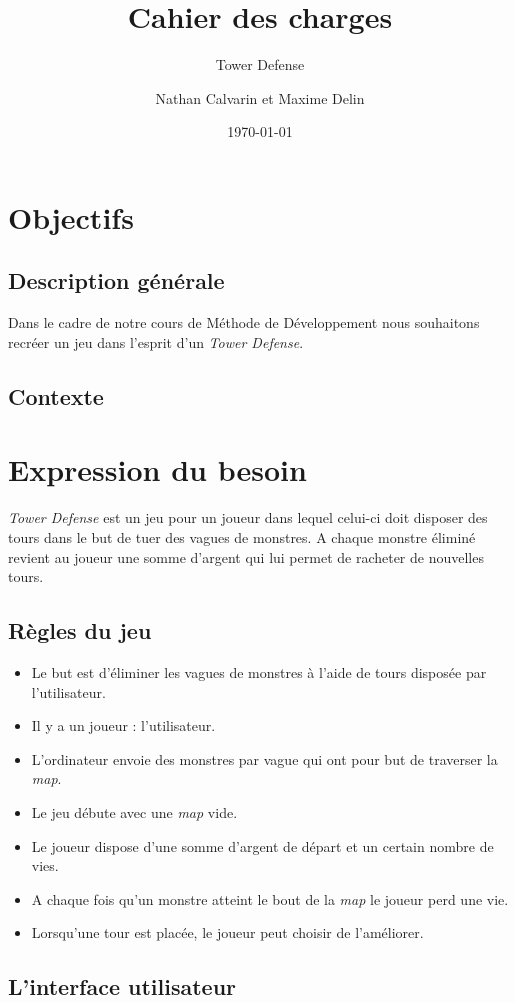 \documentclass{scrartcl}
\title{Cahier des charges}
\author{Nathan Calvarin et Maxime Delin}
\subtitle{Tower Defense}
\date{\today}
\begin{document}
\maketitle
\tableofcontents
\newpage

\section{Objectifs}
	\subsection{Description générale}
	Dans le cadre de notre cours de Méthode de Développement nous souhaitons recréer un jeu dans l'esprit d'un \emph{Tower Defense}.
	\subsection{Contexte}
\section{Expression du besoin}
\emph{Tower Defense} est un jeu pour un joueur dans lequel celui-ci doit disposer des tours dans le but de tuer des vagues de monstres. A chaque monstre éliminé revient au joueur une somme d'argent qui lui permet de racheter de nouvelles tours. 
	\subsection{Règles du jeu}
	\begin{itemize}
	\item Le but est d'éliminer les vagues de monstres à l'aide de tours disposée par l'utilisateur.
	\item Il y a un joueur : l'utilisateur.
	\item L'ordinateur envoie des monstres par vague qui ont pour but de traverser la \emph{map}.
	\item Le jeu débute avec une \emph{map} vide.
	\item Le joueur dispose d'une somme d'argent de départ et un certain nombre de vies.
	\item A chaque fois qu'un monstre atteint le bout de la \emph{map} le joueur perd une vie.
	\item Lorsqu'une tour est placée, le joueur peut choisir de l'améliorer.
	\end{itemize}
	\subsection{L'interface utilisateur}
\end{document}

